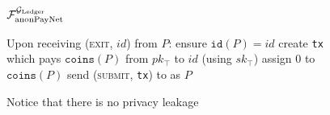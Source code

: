 \begin{figure}[H]
\begin{systembox}{$\mathcal{F}_{\mathrm{anonPayNet}}^{\mathcal{G}_{\mathrm{Ledger}}}$}
\begin{algorithmic}[1]
      \State Upon receiving (\textsc{exit}, $id$) from $P$:
      \Indent
        \State ensure $\mathtt{id}(P) = id$
        \State create \texttt{tx} which pays $\mathtt{coins}(P)$ from
        $pk_{\top}$ to $id$ (using $sk_{\top}$)
        \State assign $0$ to $\mathtt{coins}(P)$
        \State send (\textsc{submit}, \texttt{tx}) to \ledger as $P$
      \EndIndent
    \end{algorithmic}
  \end{systembox}
  \caption{Notice that there is no privacy leakage}
  \label{alg:anon-pay-func}
\end{figure}
